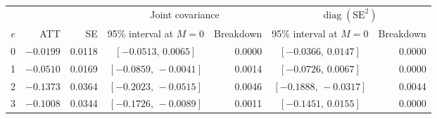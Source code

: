 \begin{tabular}{@{}rrrcrcr@{}}
    \toprule
    & & & \multicolumn{2}{c}{Joint covariance} & \multicolumn{2}{c}{$\operatorname{diag}(\mathrm{SE}^2)$} \\
    $e$ & ATT & SE & 95\% interval at $M=0$ & Breakdown & 95\% interval at $M=0$ & Breakdown \\
    \midrule
    0 & $-0.0199$ & 0.0118 & $[-0.0513,\,0.0065]$ & 0.0000 & $[-0.0366,\,0.0147]$ & 0.0000 \\
    1 & $-0.0510$ & 0.0169 & $[-0.0859,\,-0.0041]$ & 0.0014 & $[-0.0726,\,0.0067]$ & 0.0000 \\
    2 & $-0.1373$ & 0.0364 & $[-0.2023,\,-0.0515]$ & 0.0046 & $[-0.1888,\,-0.0317]$ & 0.0044 \\
    3 & $-0.1008$ & 0.0344 & $[-0.1726,\,-0.0089]$ & 0.0011 & $[-0.1451,\,0.0155]$ & 0.0000 \\
    \bottomrule
\end{tabular}
